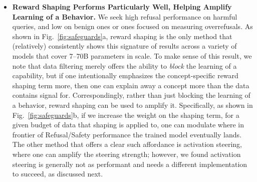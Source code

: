 \documentclass{article} %
\begin{document}
\begin{itemize}[leftmargin=*]
    \item \textbf{Reward Shaping Performs Particularly Well, Helping Amplify Learning of a Behavior.} 
    We seek high refusal performance on harmful queries, and low on benign ones or ones focused on measuring overrefusals. 
    As shown in Fig.~\ref{fig:safeguards}a, reward shaping is the only method that (relatively) consistently shows this signature of results across a variety of models that cover 7--70B parameters in scale.
    To make sense of this result, we note that data filtering merely offers the ability to \textit{block} the learning of a capability, but if one intentionally emphasizes the concept-specific reward shaping term more, then one can explain away a concept more than the data contains signal for. 
    Correspondingly, rather than just blocking the learning of a behavior, reward shaping can be used to amplify it.
    Specifically, as shown in Fig.~\ref{fig:safeguards}b, if we increase the weight on the shaping term, for a given budget of data that shaping is applied to, one can modulate where in frontier of Refusal/Safety performance the trained model eventually lands.
    The other method that offers a clear such affordance is activation steering, where one can amplify the steering strength; however, we found activation steering is generally not as performant and needs a different implementation to succeed, as discussed next.


\end{itemize}
\end{document}

